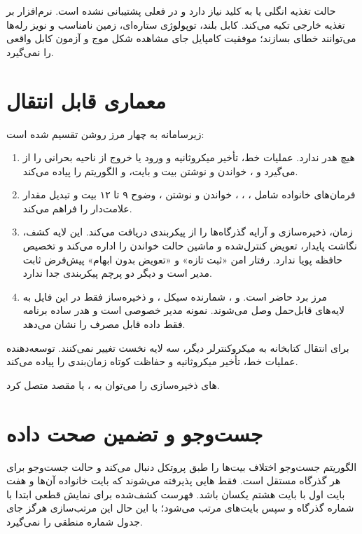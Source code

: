 حالت تغذیه انگلی یا  به کلید  نیاز دارد و در  فعلی پشتیبانی نشده است. نرم‌افزار بر تغذیه خارجی تکیه می‌کند. کابل بلند، توپولوژی ستاره‌ای، زمین نامناسب و نویز رله‌ها می‌توانند خطای  بسازند؛ موفقیت کامپایل جای مشاهده شکل موج و آزمون کابل واقعی را نمی‌گیرد.

\section{معماری قابل انتقال}
زیرسامانه به چهار مرز روشن تقسیم شده است:

\begin{enumerate}
  \item {} هیچ هدر  ندارد. عملیات خط، تأخیر میکروثانیه و ورود یا خروج از ناحیه بحرانی را از  می‌گیرد و ، خواندن و نوشتن بیت و بایت،  و الگوریتم  را پیاده می‌کند.
  \item {} فرمان‌های خانواده  شامل ، ، ، خواندن و نوشتن ، وضوح ۹ تا ۱۲ بیت و تبدیل مقدار علامت‌دار را فراهم می‌کند.
  \item {} زمان، ذخیره‌سازی و آرایه گذرگاه‌ها را از پیکربندی دریافت می‌کند. این لایه کشف، نگاشت پایدار، تعویض کنترل‌شده و ماشین حالت خواندن را اداره می‌کند و تخصیص حافظه پویا ندارد. رفتار امن «ثبت تازه» و «تعویض بدون ابهام» پیش‌فرض ثابت مدیر است و دیگر دو پرچم پیکربندی جدا ندارد.
  \item {} مرز برد حاضر است.  و ، شمارنده سیکل ،  و ذخیره‌ساز  فقط در این فایل به لایه‌های قابل‌حمل وصل می‌شوند. نمونه مدیر خصوصی است و هدر ساده برنامه فقط داده قابل مصرف را نشان می‌دهد.
\end{enumerate}

برای انتقال کتابخانه به میکروکنترلر دیگر، سه لایه نخست تغییر نمی‌کنند. توسعه‌دهنده عملیات خط، تأخیر میکروثانیه و حفاظت کوتاه زمان‌بندی را پیاده می‌کند.

های ذخیره‌سازی را می‌توان به ،  یا  مقصد متصل کرد.

\section{جست‌وجو و تضمین صحت داده}
الگوریتم جست‌وجو اختلاف بیت‌ها را طبق پروتکل  دنبال می‌کند و حالت جست‌وجو برای هر گذرگاه مستقل است. فقط هایی پذیرفته می‌شوند که بایت خانواده آن‌ها  و  هفت بایت اول با بایت هشتم یکسان باشد. فهرست کشف‌شده برای نمایش قطعی ابتدا با شماره گذرگاه و سپس بایت‌های  مرتب می‌شود؛ با این حال این مرتب‌سازی هرگز جای جدول شماره منطقی را نمی‌گیرد.

